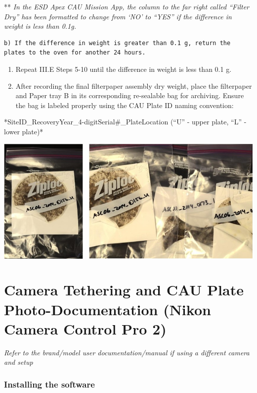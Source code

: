 \documentclass[]{book}
\begin{document}
** \emph{In the ESD Apex CAU Mission App, the column to the far right called ``Filter Dry'' has been formatted to change from `NO' to ``YES'' if the difference in weight is less than 0.1g.}

\begin{verbatim}
b) If the difference in weight is greater than 0.1 g, return the plates to the oven for another 24 hours.  
\end{verbatim}

\begin{enumerate}
\def\labelenumi{\arabic{enumi}.}
\setcounter{enumi}{10}
\item
  Repeat III.E Steps 5-10 until the difference in weight is less than 0.1 g.
\item
  After recording the final filterpaper assembly dry weight, place the filterpaper and Paper tray B in its corresponding re-sealable bag for archiving. Ensure the bag is labeled properly using the CAU Plate ID naming convention:
\end{enumerate}

*SiteID\_RecoveryYear\_4-digitSerial\#\_PlateLocation (``U'' - upper plate, ``L'' - lower plate)*

\includegraphics{images/CAU_bag.jpg}

\hypertarget{camera-tethering-and-cau-plate-photo-documentation-nikon-camera-control-pro-2}{%
\section{Camera Tethering and CAU Plate Photo-Documentation (Nikon Camera Control Pro 2)}\label{camera-tethering-and-cau-plate-photo-documentation-nikon-camera-control-pro-2}}

\emph{Refer to the brand/model user documentation/manual if using a different camera and setup}

\hypertarget{installing-the-software}{%
\subsubsection{Installing the software}\label{installing-the-software}}
\end{document}

